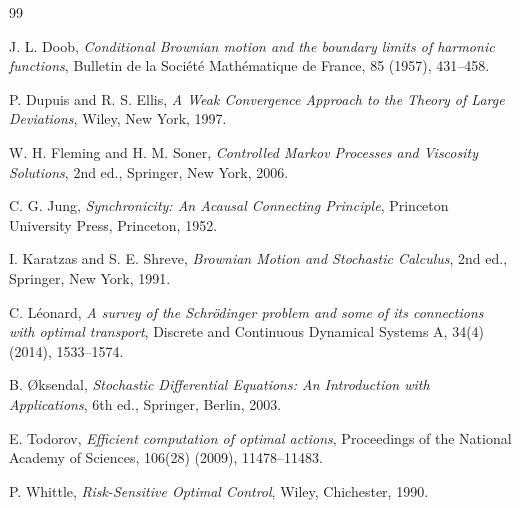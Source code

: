 \documentclass[12pt]{article}
\begin{document}
\begin{thebibliography}{99}

J. L. Doob,
\emph{Conditional Brownian motion and the boundary limits of harmonic functions},
Bulletin de la Soci\'et\'e Math\'ematique de France, 85 (1957), 431--458.

P. Dupuis and R. S. Ellis,
\emph{A Weak Convergence Approach to the Theory of Large Deviations},
Wiley, New York, 1997.

W. H. Fleming and H. M. Soner,
\emph{Controlled Markov Processes and Viscosity Solutions},
2nd ed., Springer, New York, 2006.

C. G. Jung,
\emph{Synchronicity: An Acausal Connecting Principle},
Princeton University Press, Princeton, 1952.

I. Karatzas and S. E. Shreve,
\emph{Brownian Motion and Stochastic Calculus},
2nd ed., Springer, New York, 1991.

C. L\'eonard,
\emph{A survey of the Schr\"odinger problem and some of its connections with optimal transport},
Discrete and Continuous Dynamical Systems A, 34(4) (2014), 1533--1574.

B. \O ksendal,
\emph{Stochastic Differential Equations: An Introduction with Applications},
6th ed., Springer, Berlin, 2003.

E. Todorov,
\emph{Efficient computation of optimal actions},
Proceedings of the National Academy of Sciences, 106(28) (2009), 11478--11483.

P. Whittle,
\emph{Risk-Sensitive Optimal Control},
Wiley, Chichester, 1990.

\end{thebibliography}
\end{document}
